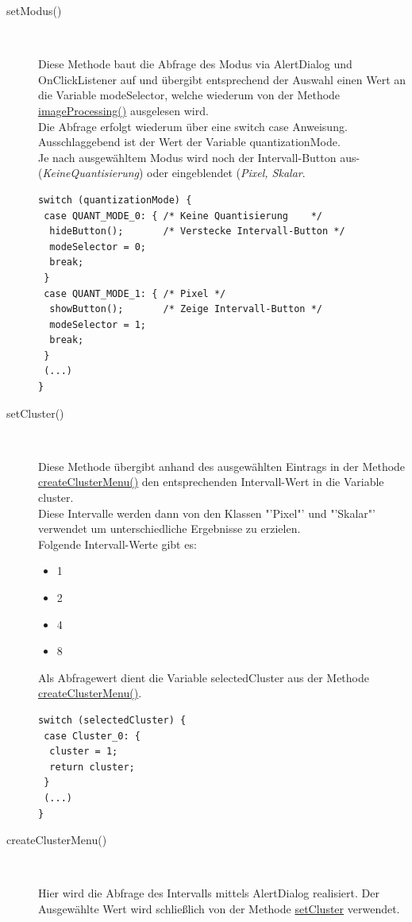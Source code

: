 \begin{description}
\item[setModus()]~\par
\label{setModus}
Diese Methode baut die Abfrage des Modus via AlertDialog und OnClickListener auf und übergibt entsprechend der Auswahl einen Wert an die Variable \textcolor{lila}{modeSelector}, welche wiederum von der Methode \hyperref[imageProcessing]{imageProcessing()} ausgelesen wird.\\
Die Abfrage erfolgt wiederum über eine switch case Anweisung. Ausschlaggebend ist der Wert der Variable \textcolor{lila}{quantizationMode}.\\
Je nach ausgewähltem Modus wird noch der Intervall-Button aus- (\textit{KeineQuantisierung}) oder eingeblendet (\textit{Pixel, Skalar}.
\begin{lstlisting}
switch (quantizationMode) {
 case QUANT_MODE_0: { /* Keine Quantisierung	*/
  hideButton();       /* Verstecke Intervall-Button */
  modeSelector = 0;
  break;
 }
 case QUANT_MODE_1: { /* Pixel */
  showButton();       /* Zeige Intervall-Button */
  modeSelector = 1;
  break;
 }
 (...)
}
\end{lstlisting}

\item[setCluster()]~\par
\label{setCluster}
Diese Methode übergibt anhand des ausgewählten Eintrags in der Methode \hyperref[createClusterMenu]{createClusterMenu()} den entsprechenden Intervall-Wert in die Variable \textcolor{lila}{cluster}.\\
Diese Intervalle werden dann von den Klassen "'Pixel"' und "'Skalar"' verwendet um unterschiedliche Ergebnisse zu erzielen.\\
Folgende Intervall-Werte gibt es:
\begin{itemize}
\item 1
\item 2
\item 4
\item 8
\end{itemize}
Als Abfragewert dient die Variable \textcolor{lila}{selectedCluster} aus der Methode \hyperref[createClusterMenu]{createClusterMenu()}.
\begin{lstlisting}
switch (selectedCluster) {
 case Cluster_0: {
  cluster = 1;
  return cluster;
 }
 (...)
} 
\end{lstlisting}

\item[createClusterMenu()]~\par
\label{createClusterMenu}
Hier wird die Abfrage des Intervalls mittels AlertDialog realisiert. Der Ausgewählte Wert wird schließlich von der Methode \hyperref[setCluster]{setCluster} verwendet.


\end{description}
